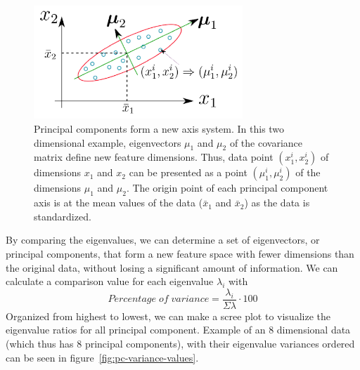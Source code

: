 \begin{figure}[htb]
    \centering
    \includegraphics[width=0.7\textwidth]{./appendices/pca-example}
    \caption{Principal components form a new axis system.
    In this two dimensional example,
        eigenvectors $\mu_{1}$ and $\mu_{2}$ of the covariance matrix
        define new feature dimensions.
        Thus, data point $(x_{1}^{i},x_{2}^{i})$ of dimensions $x_{1}$ and $x_{2}$
        can be presented as a point $(\mu_{1}^{i},\mu_{2}^{i})$ of the dimensions $\mu_{1}$ and $\mu_{2}$.
        The origin point of each principal component axis is at the mean values of the data ($\bar{x}_{1}$ and $\bar{x}_{2}$)
        as the data is standardized.
        ~\cite{zhu2019dimension}
        \label{fig:pca-example}}
\end{figure}

By comparing the eigenvalues,
we can determine a set of eigenvectors,
or principal components,
that form a new feature space with fewer dimensions than the original data,
without losing a significant amount of information.
We can calculate a comparison value for each eigenvalue $\lambda_{i}$ with
\begin{equation}
    Percentage\; of\; variance = \frac{\lambda_{i}}{\Sigma\lambda}\cdot100
\end{equation}
Organized from highest to lowest,
we can make a scree plot to visualize the eigenvalue ratios
for all principal component.
Example of an 8 dimensional data
(which thus has 8 principal components),
with their eigenvalue variances ordered
can be seen in figure~\ref{fig:pc-variance-values}.


